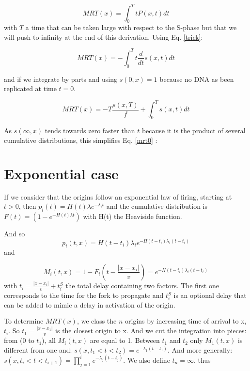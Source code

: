 \documentclass[10pt,a4paper]{revtex4-2}
\begin{document}
\begin{equation}\label{omrt}
MRT(x) =  \int_{0}^{T} t P(x,t) dt
\end{equation}
with $T$ a time that can be taken large with respect to the S-phase but that we will push to infinity at the end of this derivation. Using Eq. \eqref{trick}:

\begin{equation*}
MRT(x) = - \int_{0}^{T} t \frac{ d }{dt} s(x,t) dt
\end{equation*}

and if we integrate by parts and using $s(0,x)=1$ because no DNA as been replicated at time $t=0$.

\begin{equation}\label{mrt0}
MRT(x) =  -T\frac{s(x,T)}{f} + \int_{0}^{T} s(x,t) dt
\end{equation}

As $s(\infty,x)$ tends towards zero faster than $t$ because it is the product of several cumulative distributions, this simplifies Eq. \eqref{mrt0} :



\section{Exponential case}\label{appendix:exponential}

If we consider that the origins follow an exponential law of firing, starting at $t>0$, then
$p_i(t) = H(t)\lambda e^{-\lambda_i t}$
and the cumulative distribution is $F(t) = (1-e^{-H(t)\lambda t})$ with H(t) the Heaviside function.


And so 
\begin{equation}
p_i(t,x) =  H(t-t_i)\lambda_ie^{-H(t-t_i)\lambda_i(t-t_i)}
\end{equation}
and
 
\begin{equation}
M_i(t,x) = 1-F_i \left(t-\frac{|x-x_i|}{v}\right) = e^{-H(t-t_i)\lambda_i(t-t_i)}
\end{equation}
with $t_i =\frac{|x-x_i|}{v} + t_i^S$ the total delay containing two factors. The first one corresponds to the time for the fork to propagate and $t_i^S$ is an optional delay that can be added to mimic a delay in activation of the origin.


To determine $MRT(x)$, we class the $n$ origins by increasing time of arrival to x,  $t_i$. So $t_1 =\frac{|x-x_1|}{v}$ is the closest origin to x. And we cut the integration into pieces: from (0 to $t_1$), all $M_i(t,x)$ are equal to 1. Between $t_1$ and $t_2$ only $M_1(t,x)$ is different from one and:
$s(x,t_1<t<t_2) = e^{-\lambda_1(t-t_1)}$. And more generally:
$s(x,t_i<t<t_{i+1}) = \prod_{j=1}^{i}  e^{-\lambda_j(t-t_j)}$. We also define $t_{n}=\infty$, thus 
\end{document}
